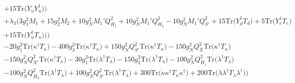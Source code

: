 {\begin{align}
 &+15 \mbox{Tr}\Big({Y_u  Y_{u}^{\dagger}}\Big) \Big)\nonumber \\ 
 &+\lambda_3 \Big(3 g_{1}^{2} M_1 +15 g_{2}^{2} M_2 +10 g_{N}^{2} M_1' Q_{H_1}^{2} +10 g_{N}^{2} M_1' Q_{H_2}^{2} -10 g_{N}^{2} M_1' Q_{S'}^{2} +15 \mbox{Tr}\Big({Y_{d}^{\dagger}  T_d}\Big) +5 \mbox{Tr}\Big({Y_{e}^{\dagger}  T_e}\Big) \nonumber \\ 
 &+15 \mbox{Tr}\Big({Y_{u}^{\dagger}  T_u}\Big) \Big)\Big)\nonumber \\ 
 &-20 g_{1}^{2} \mbox{Tr}\Big({\kappa^{\dagger}  T_{\kappa}}\Big) -400 g_{3}^{2} \mbox{Tr}\Big({\kappa^{\dagger}  T_{\kappa}}\Big) +150 g_{N}^{2} Q_{S'}^{2} \mbox{Tr}\Big({\kappa^{\dagger}  T_{\kappa}}\Big) -150 g_{N}^{2} Q_{\bar{X}}^{2} \mbox{Tr}\Big({\kappa^{\dagger}  T_{\kappa}}\Big) \nonumber \\ 
 &-150 g_{N}^{2} Q_{X'}^{2} \mbox{Tr}\Big({\kappa^{\dagger}  T_{\kappa}}\Big) -30 g_{1}^{2} \mbox{Tr}\Big({\lambda^{\dagger}  T_{\lambda}}\Big) -150 g_{2}^{2} \mbox{Tr}\Big({\lambda^{\dagger}  T_{\lambda}}\Big) -100 g_{N}^{2} Q_{H_1}^{2} \mbox{Tr}\Big({\lambda^{\dagger}  T_{\lambda}}\Big) \nonumber \\ 
 &-100 g_{N}^{2} Q_{H_2}^{2} \mbox{Tr}\Big({\lambda^{\dagger}  T_{\lambda}}\Big) +100 g_{N}^{2} Q_{S'}^{2} \mbox{Tr}\Big({\lambda^{\dagger}  T_{\lambda}}\Big) +300 \mbox{Tr}\Big({\kappa  \kappa^{\dagger}  T_{\kappa}  \kappa^{\dagger}}\Big) +200 \mbox{Tr}\Big({\lambda  \lambda^{\dagger}  T_{\lambda}  \lambda^{\dagger}}\Big) \Big)
\end{align}} 
